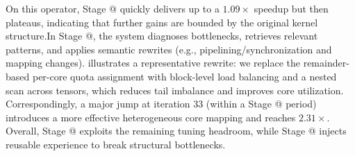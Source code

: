 \documentclass{article}
\makeatletter
\theoremstyle{plain}
\theoremstyle{definition}
\theoremstyle{remark}
\newcommand{\Rmnum}[1]{\expandafter\@slowromancap\romannumeral #1@}
\makeatother
\begin{document}
On this operator, Stage \Rmnum{1} quickly delivers up to a $\num{1.09}\times$ speedup but then plateaus, indicating that further gains are bounded by the original kernel structure.In Stage \Rmnum{2}, the system diagnoses bottlenecks, retrieves relevant patterns, and applies semantic rewrites (e.g., pipelining/synchronization and mapping changes).  illustrates a representative rewrite: we replace the remainder-based per-core quota assignment with block-level load balancing and a nested scan across tensors, which reduces tail imbalance and improves core utilization. Correspondingly, a major jump at iteration 33 (within a Stage \Rmnum{2} period) introduces a more effective heterogeneous core mapping and reaches $\num{2.31}\times$.
Overall, Stage \Rmnum{1} exploits the remaining tuning headroom, while Stage \Rmnum{2} injects reusable experience to break structural bottlenecks.
\end{document}
